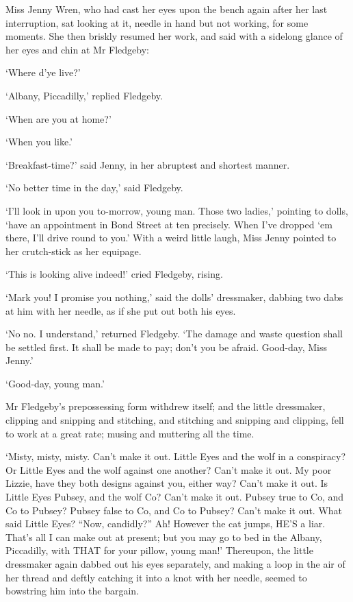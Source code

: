 Miss Jenny Wren, who had cast her eyes upon the bench again after her
last interruption, sat looking at it, needle in hand but not working,
for some moments. She then briskly resumed her work, and said with a
sidelong glance of her eyes and chin at Mr Fledgeby:

‘Where d’ye live?’

‘Albany, Piccadilly,’ replied Fledgeby.

‘When are you at home?’

‘When you like.’

‘Breakfast-time?’ said Jenny, in her abruptest and shortest manner.

‘No better time in the day,’ said Fledgeby.

‘I’ll look in upon you to-morrow, young man. Those two ladies,’ pointing
to dolls, ‘have an appointment in Bond Street at ten precisely. When
I’ve dropped ‘em there, I’ll drive round to you.’ With a weird little
laugh, Miss Jenny pointed to her crutch-stick as her equipage.

‘This is looking alive indeed!’ cried Fledgeby, rising.

‘Mark you! I promise you nothing,’ said the dolls’ dressmaker, dabbing
two dabs at him with her needle, as if she put out both his eyes.

‘No no. I understand,’ returned Fledgeby. ‘The damage and waste question
shall be settled first. It shall be made to pay; don’t you be afraid.
Good-day, Miss Jenny.’

‘Good-day, young man.’

Mr Fledgeby’s prepossessing form withdrew itself; and the little
dressmaker, clipping and snipping and stitching, and stitching and
snipping and clipping, fell to work at a great rate; musing and
muttering all the time.

‘Misty, misty, misty. Can’t make it out. Little Eyes and the wolf in a
conspiracy? Or Little Eyes and the wolf against one another? Can’t make
it out. My poor Lizzie, have they both designs against you, either way?
Can’t make it out. Is Little Eyes Pubsey, and the wolf Co? Can’t make it
out. Pubsey true to Co, and Co to Pubsey? Pubsey false to Co, and Co to
Pubsey? Can’t make it out. What said Little Eyes? “Now, candidly?”
 Ah! However the cat jumps, HE’S a liar. That’s all I can make out at
present; but you may go to bed in the Albany, Piccadilly, with THAT for
your pillow, young man!’ Thereupon, the little dressmaker again dabbed
out his eyes separately, and making a loop in the air of her thread and
deftly catching it into a knot with her needle, seemed to bowstring him
into the bargain.

